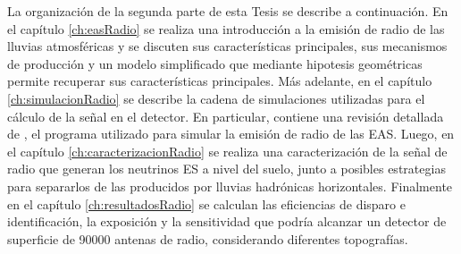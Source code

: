 La organizaci\'on de la segunda parte de esta Tesis se describe a continuaci\'on.
En el capítulo \ref{ch:easRadio} se realiza una introducción a la emisión de radio de las lluvias atmosféricas y se discuten sus características principales, sus mecanismos de producción y un modelo simplificado que mediante hipotesis geom\'etricas permite recuperar sus características principales.
Más adelante, en el capítulo \ref{ch:simulacionRadio} se describe la cadena de simulaciones utilizadas para el c\'alculo de la se\~nal en el detector. 
En particular, contiene una revisión detallada de \zhs{}, el programa utilizado para simular la emisión de radio de las EAS.
Luego, en el cap\'itulo \ref{ch:caracterizacionRadio} se realiza una caracterización de la señal de radio que generan los neutrinos ES  a nivel del suelo, junto a posibles estrategias para separarlos de las producidos por lluvias hadr\'onicas horizontales.
Finalmente en el capítulo \ref{ch:resultadosRadio} se calculan las eficiencias de disparo e identificaci\'on, la exposición y la sensitividad que podría alcanzar un detector de superficie de 90000 antenas de radio, considerando diferentes topografías.


